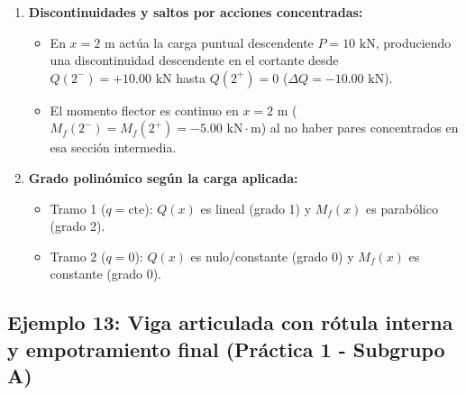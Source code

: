{\begin{enumerate}
\begin{itemize}
              \end{itemize}



        \item \textbf{Discontinuidades y saltos por acciones concentradas:}

              \begin{itemize}

                  \item En $x = 2\text{ m}$ actúa la carga puntual descendente $P = 10\text{ kN}$, produciendo una discontinuidad descendente en el cortante desde $Q(2^-) = +10.00\text{ kN}$ hasta $Q(2^+) = 0$ ($\Delta Q = -10.00\text{ kN}$).

                  \item El momento flector es continuo en $x = 2\text{ m}$ ($M_f(2^-) = M_f(2^+) = -5.00\text{ kN}\cdot\text{m}$) al no haber pares concentrados en esa sección intermedia.

              \end{itemize}



        \item \textbf{Grado polinómico según la carga aplicada:}

              \begin{itemize}

                  \item Tramo 1 ($q = \text{cte}$): $Q(x)$ es lineal (grado 1) y $M_f(x)$ es parabólico (grado 2).

                  \item Tramo 2 ($q = 0$): $Q(x)$ es nulo/constante (grado 0) y $M_f(x)$ es constante (grado 0).

              \end{itemize}

    \end{enumerate}

}



\subsection{Ejemplo 13: Viga articulada con rótula interna y empotramiento final (Práctica 1 - Subgrupo A)}



